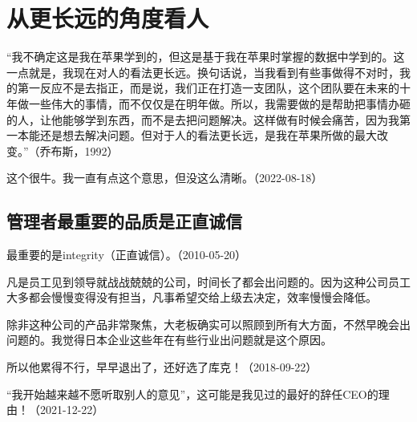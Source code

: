
\section{从更长远的角度看人}

“我不确定这是我在苹果学到的，但这是基于我在苹果时掌握的数据中学到的。这一点就是，我现在对人的看法更长远。换句话说，当我看到有些事做得不对时，我的第一反应不是去指正，而是说，我们正在打造一支团队，这个团队要在未来的十年做一些伟大的事情，而不仅仅是在明年做。所以，我需要做的是帮助把事情办砸的人，让他能够学到东西，而不是去把问题解决。这样做有时候会痛苦，因为我第一本能还是想去解决问题。但对于人的看法更长远，是我在苹果所做的最大改变。”（乔布斯，1992）

这个很牛。我一直有点这个意思，但没这么清晰。（2022-08-18）

\subsection{管理者最重要的品质是正直诚信}


最重要的是integrity（正直诚信）。（2010-05-20）


凡是员工见到领导就战战兢兢的公司，时间长了都会出问题的。因为这种公司员工大多都会慢慢变得没有担当，凡事希望交给上级去决定，效率慢慢会降低。

除非这种公司的产品非常聚焦，大老板确实可以照顾到所有大方面，不然早晚会出问题的。我觉得日本企业这些年在有些行业出问题就是这个原因。


所以他累得不行，早早退出了，还好选了库克！（2018-09-22）


“我开始越来越不愿听取别人的意见”，这可能是我见过的最好的辞任CEO的理由！（2021-12-22）



